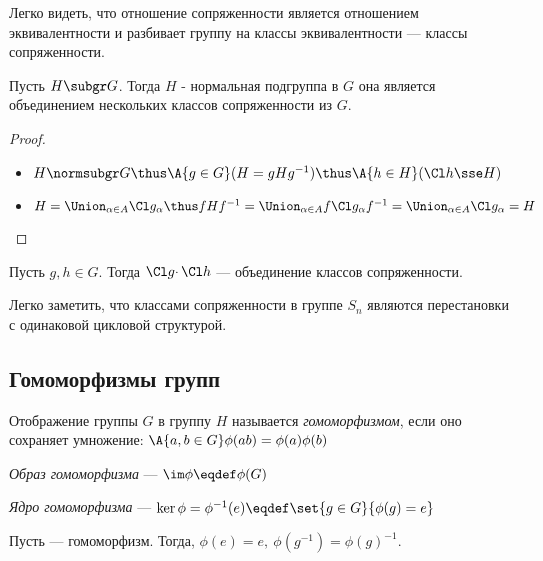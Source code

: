 Легко видеть, что отношение сопряженности является отношением эквивалентности и разбивает группу на классы эквивалентности --- классы сопряженности.

\begin{theorem}
  Пусть $H \subgr G$. Тогда $H$ - нормальная подгруппа в $G$ \iff она является объединением нескольких классов сопряженности из $G$.
\end{theorem}
\begin{proof}
  \theoremlistshack
  \begin{itemize}
    \item[\thus] $H\normsubgr G \thus \A{g \in G}(H=gHg^{-1}) \thus \A{h \in H}(\Cl h\sse H)$
    \item[\because] \sloppy $H=\Union_{\alpha\in A}\Cl g_\alpha \thus fHf^{-1}=\Union_{\alpha\in A}f\Cl g_\alpha f^{-1}=\Union_{\alpha\in A}\Cl g_\alpha=H$
  \end{itemize}
\end{proof}

\begin{theorem}
  Пусть $g, h \in G$. Тогда $\Cl g \cdotp\Cl h$ --- объединение классов сопряженности.
\end{theorem}

\begin{example}
  Легко заметить, что классами сопряженности в группе $S_n$ являются перестановки с одинаковой цикловой структурой.
\end{example}

\subsection{Гомоморфизмы групп}
\begin{definition}
  Отображение  группы $G$ в группу $H$ называется \emph{гомоморфизмом}, если оно сохраняет умножение: $\A{a,b \in G} \phi(ab)=\phi(a)\phi(b)$
\end{definition}

\begin{definition}
  \emph{Образ гомоморфизма} --- $\im\phi\eqdef\phi(G)$
\end{definition}

\begin{definition}
  \emph{Ядро гомоморфизма} --- $\ker\phi=\phi^{-1}(e)\eqdef\set{g\in G}{\phi(g)=e}$
\end{definition}

\begin{theorem}
  Пусть \phi --- гомоморфизм. Тогда, $\phi(e)=e,\ \phi(g^{-1})=\phi(g)^{-1}$.
\end{theorem}

